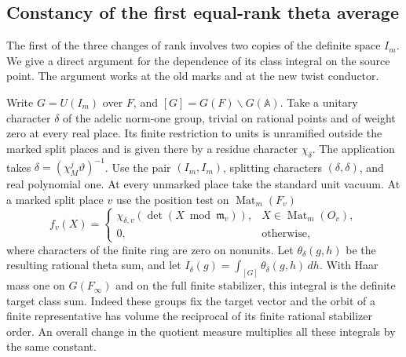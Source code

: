 \documentclass[a4paper,11pt]{article}
\theoremstyle{definition}
\theoremstyle{remark}
\numberwithin{equation}{section}
\begin{document}
\subsection{Constancy of the first equal-rank theta average}
\label{sec:equalrankaverage826}
The first of the three changes of rank involves two copies of
the definite space \(I_m\). We give a direct argument for the
dependence of its class integral on the source point. The
argument works at the old marks and at the new twist conductor.

Write \(G=U(I_m)\) over \(F\), and \([G]=G(F)\backslash
G(\mathbb A)\). Take a unitary character \(\delta\) of the
adelic norm-one group, trivial on rational points and of
weight zero at every real place. Its finite restriction to
units is unramified outside the marked split places and is
given there by a residue character \(\chi_\delta\). The
application takes \(\delta=(\chi_M^j\vartheta)^{-1}\).
Use the pair \((I_m,I_m)\), splitting characters
\((\delta,\delta)\), and real polynomial one. At every
unmarked place take the standard unit vacuum. At a marked
split place \(v\) use the position test on
\(\operatorname{Mat}_m(F_v)\)
\[
 f_v(X)=
 \begin{cases}
   \chi_{\delta,v}(\det(X\bmod\mathfrak m_v)),&
                           X\in\operatorname{Mat}_m(O_v),\\
   0,&\text{otherwise},
 \end{cases}
\]
where characters of the finite ring are zero on nonunits.
Let \(\theta_\delta(g,h)\) be the resulting rational theta
sum, and let \(I_\delta(g)=\int_{[G]}\theta_\delta(g,h)\,dh\).
With Haar mass one on \(G(F_\infty)\) and on the full finite
stabilizer, this integral is the definite target class sum.
Indeed these groups fix the target vector and the orbit of
a finite representative has volume the reciprocal of its
finite rational stabilizer order. An overall change in the
quotient measure multiplies all these integrals by the same
constant.
\end{document}
